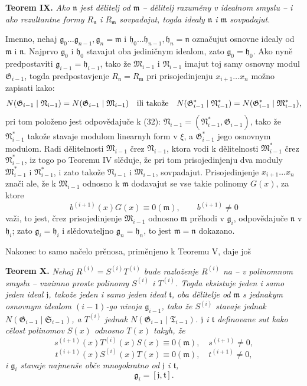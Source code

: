 \documentclass[11pt]{article}
\providecommand{\Gmod}{\mathfrak G}
\providecommand{\Mmod}{\mathfrak M}
\providecommand{\Nmod}{\mathfrak N}
\providecommand{\Smod}{\mathfrak S}
\providecommand{\mideal}{\mathfrak m}
\providecommand{\nideal}{\mathfrak n}
\providecommand{\gideal}{\mathfrak g}
\providecommand{\hideal}{\mathfrak h}
\providecommand{\jideal}{\mathfrak j}
\providecommand{\tideal}{\mathfrak t}
\begin{document}
\medskip
\noindent\textbf{Teorem IX.} {\itshape Ako $\nideal$ jest dělitelj od $\mideal$ -- dělitelj razuměny v idealnom smyslu -- i ako rezultantne formy $R_\nideal$ i $R_\mideal$ sovpadajut, togda idealy $\nideal$ i $\mideal$ sovpadajut.}

Imenno, nehaj $\gideal_0\ldots\gideal_{n-1},\gideal_n=\mideal$ i $\hideal_0\ldots\hideal_{n-1},\hideal_n=\nideal$ označujut osnovne idealy od $\mideal$ i $\nideal$. Najprvo $\gideal_0$ i $\hideal_0$ stavajut oba jediničnym idealom, zato $\gideal_0=\hideal_0$. Ako nyně predpostaviti $\gideal_{i-1}=\hideal_{i-1}$, tako že $\Mmod_{i-1}$ i $\Nmod_{i-1}$ imajut toj samy osnovny modul $\Gmod_{i-1}$, togda predpostavjenje $R_\nideal=R_\mideal$ pri prisojedinjenju $x_{i+1}\ldots x_n$ možno zapisati kako:
\[
 N(\Gmod_{i-1}\mid\Nmod_{i-1})=N(\Gmod_{i-1}\mid\Mmod_{i-1})
 \quad\hbox{ili takože}\quad
 N(\Gmod^*_{i-1}\mid\Nmod^*_{i-1})=N(\Gmod^*_{i-1}\mid\Mmod^*_{i-1}),
\]
pri tom položeno jest odpovědajuče k (32): $\Nmod_{i-1}=(\Nmod^*_{i-1},\Gmod_{i-1})$, tako že $\Nmod^*_{i-1}$ takože stavaje modulom linearnyh form v $\xi$, a $\Gmod^*_{i-1}$ jego osnovnym modulom. Radi dělitelnosti $\Mmod_{i-1}$ črez $\Nmod_{i-1}$, ktora vodi k dělitelnosti $\Mmod^*_{i-1}$ črez $\Nmod^*_{i-1}$, iz togo po Teoremu IV slěduje, že pri tom prisojedinjenju dva moduly $\Mmod^*_{i-1}$ i $\Nmod^*_{i-1}$, i zato takože $\Nmod_{i-1}$ i $\Mmod_{i-1}$, sovpadajut. Prisojedinjenje $x_{i+1}\ldots x_n$ znači ale, že k $\Mmod_{i-1}$ odnosno k $\mideal$ dodavajut se vse takie polinomy $G(x)$, za ktore
\[
 b^{(i+1)}(x)G(x)\equiv0(\mideal),
 \qquad b^{(i+1)}\ne0
\]
važi, to jest, črez prisojedinjenje $\Mmod_{i-1}$ odnosno $\mideal$ prěhodi v $\gideal_i$, odpovědajuče $\nideal$ v $\hideal_i$; zato $\gideal_i=\hideal_i$ i slědovateljno $\gideal_n=\hideal_n$, to jest $\mideal=\nideal$ dokazano.

Nakonec to samo načelo prěnosa, priměnjeno k Teoremu V, daje još

\medskip
\noindent\textbf{Teorem X.} {\itshape Nehaj $R^{(i)}=S^{(i)}T^{(i)}$ bude razloženje $R^{(i)}$ na -- v polinomnom smyslu -- vzaimno proste polinomy $S^{(i)}$ i $T^{(i)}$. Togda eksistuje jeden i samo jeden ideal $\jideal$, takože jeden i samo jeden ideal $\tideal$, oba dělitelje od $\mideal$ s jednakym osnovnym idealom $(i-1)$-go nivoja $\gideal_{i-1}$, tako že $S^{(i)}$ stavaje jednak $N(\Gmod_{i-1}\mid\Smod_{i-1})$, a $T^{(i)}$ jednak $N(\Gmod_{i-1}\mid\mathfrak T_{i-1})$. $\jideal$ i $\tideal$ definovane sut kako cělost polinomov $S(x)$ odnosno $T(x)$ takyh, že}
\[
 s^{(i+1)}(x)T^{(i)}(x)S(x)\equiv0(\mideal),\quad s^{(i+1)}\ne0,
\]
\[
 t^{(i+1)}(x)S^{(i)}(x)T(x)\equiv0(\mideal),\quad t^{(i+1)}\ne0,
\]
{\itshape i $\gideal_i$ stavaje najmenše obče mnogokratno od $\jideal$ i $\tideal$,}
\[
 \gideal_i=[\jideal,\tideal].
\]
\end{document}
